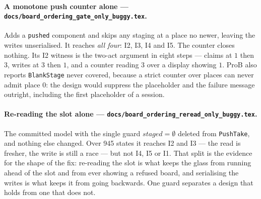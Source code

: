 \documentclass[a4paper,10pt,fleqn]{article}
\begin{document}
\paragraph{A monotone push counter alone ---
\texttt{docs/board\_ordering\_gate\_only\_buggy.tex}.}
Adds a \texttt{pushed} component and skips any staging at a place no newer,
leaving the writes unserialised. It reaches \emph{all four}: I2, I3, I4 and I5.
The counter closes nothing. Its I2 witness is the two-act argument in eight
steps --- claims at $1$ then $3$, writes at $3$ then $1$, and a counter reading
$3$ over a display showing $1$. ProB also reports \texttt{BlankStage} never
covered, because a strict counter over places can never admit place $0$: the
design would suppress the placeholder and the failure message outright,
including the first placeholder of a session.

\paragraph{Re-reading the slot alone ---
\texttt{docs/board\_ordering\_reread\_only\_buggy.tex}.}
The committed model with the single guard $staged = \emptyset$ deleted from
\texttt{PushTake}, and nothing else changed. Over 945 states it reaches I2 and
I3 --- the read is fresher, the write is still a race --- but not I4, I5 or I1.
That split is the evidence for the shape of the fix: re-reading the slot is what
keeps the glass from running ahead of the slot and from ever showing a refused
board, and serialising the writes is what keeps it from going backwards. One
guard separates a design that holds from one that does not.
\end{document}
